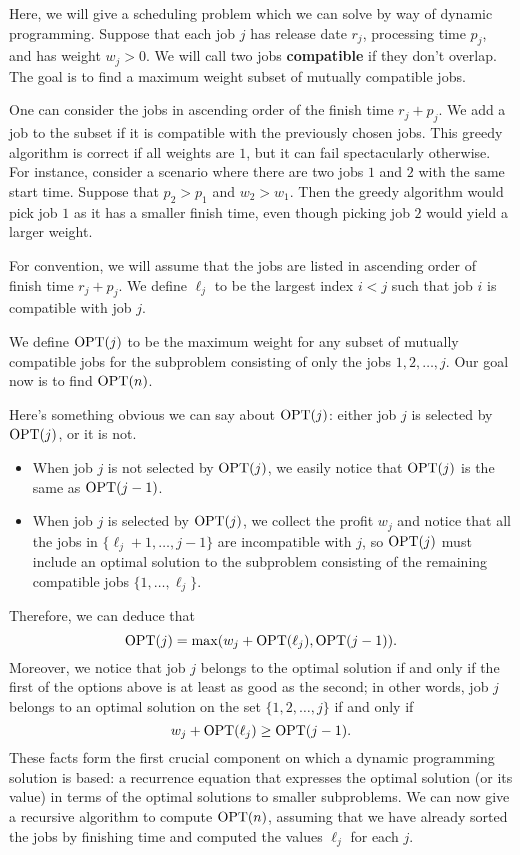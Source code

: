 Here, we will give a scheduling problem which we can solve by way of 
dynamic programming. Suppose that each job $j$ has release date $r_j$, 
processing time $p_j$, and has weight $w_j > 0$. We will call 
two jobs {\bf compatible} if they don't overlap. The goal is to find a 
maximum weight subset of mutually compatible jobs. 

One can consider the jobs in ascending order of the finish time $r_j + p_j$. 
We add a job to the subset if it is compatible with the previously chosen jobs. 
This greedy algorithm is correct if all weights are $1$, but it can fail 
spectacularly otherwise. For instance, consider a scenario where there are 
two jobs $1$ and $2$ with the same start time. Suppose that $p_2 > p_1$ and
$w_2 > w_1$. Then the greedy algorithm would pick job $1$ as it has a 
smaller finish time, even though picking job $2$ would yield a larger weight. 

For convention, we will assume that the jobs are listed in ascending 
order of finish time $r_j + p_j$. We define $\ell_j$ to be the largest index 
$i < j$ such that job $i$ is compatible with job $j$. 

We define $\operatorname{OPT}(j)$ to be the maximum weight for any subset of 
mutually compatible jobs for the subproblem consisting of only the jobs 
$1, 2, \dots, j$. Our goal now is to find $\operatorname{OPT}(n)$. 

Here's something obvious we can say about $\operatorname{OPT}(j)$: either job $j$ is 
selected by $\operatorname{OPT}(j)$, or it is not. 
\begin{itemize}
    \item When job $j$ is not selected by $\operatorname{OPT}(j)$, we easily notice that 
    $\operatorname{OPT}(j)$ is the same as $\operatorname{OPT}(j-1)$.
    \item When job $j$ is selected by $\operatorname{OPT}(j)$, we collect the profit 
    $w_j$ and notice that all the jobs in $\{\ell_j+1, \dots, j-1\}$ 
    are incompatible with $j$, so $\operatorname{OPT}(j)$ must include an optimal 
    solution to the subproblem consisting of the remaining compatible jobs 
    $\{1, \dots, \ell_j\}$. 
\end{itemize} 
Therefore, we can deduce that 
\[ \operatorname{OPT}(j) = \max(w_j + \operatorname{OPT}(\ell_j), \operatorname{OPT}(j-1)). \] 
Moreover, we notice that job $j$ belongs to the optimal solution if and only if 
the first of the options above is at least as good as the second; in other 
words, job $j$ belongs to an optimal solution on the set $\{1, 2, \dots, j\}$ 
if and only if 
\begin{equation}\label{eq:1.1}
    w_j + \operatorname{OPT}(\ell_j) \geq \operatorname{OPT}(j-1). 
\end{equation} 
These facts form the first crucial component on which a dynamic 
programming solution is based: a recurrence equation that expresses the 
optimal solution (or its value) in terms of the optimal solutions to smaller 
subproblems. We can now give a recursive algorithm to compute $\operatorname{OPT}(n)$, 
assuming that we have already sorted the jobs by finishing time and 
computed the values $\ell_j$ for each $j$. 

